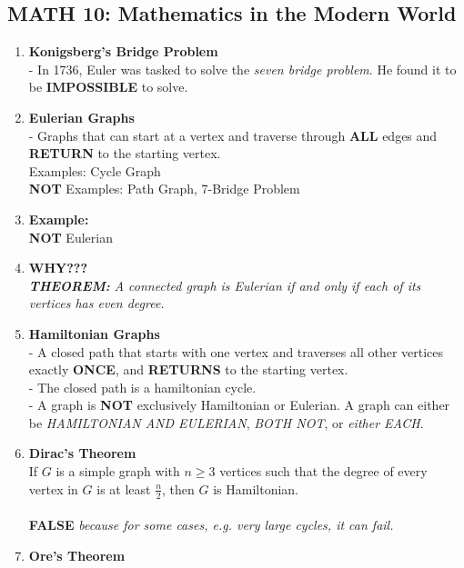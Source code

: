 \documentclass{article}
\begin{document}
\subsection*{MATH 10: Mathematics in the Modern World}
\begin{enumerate}
    \item \textbf{Konigsberg's Bridge Problem} \\
    - In 1736, Euler was tasked to solve the \textit{seven bridge problem}. He found it to be \textbf{IMPOSSIBLE} to solve. \\
    \item \textbf{Eulerian Graphs} \\
    - Graphs that can start at a vertex and traverse through \textbf{ALL} edges and \textbf{RETURN} to the starting vertex. \\
    Examples: Cycle Graph \\
    \textbf{NOT} Examples: Path Graph, 7-Bridge Problem
    \item \textbf{Example:} \\
    \textbf{NOT} Eulerian \\
    \item \textbf{WHY???} \\
    \textit{\textbf{THEOREM: }A connected graph is Eulerian if and only if each of its vertices has even degree.}
    \item \textbf{Hamiltonian Graphs} \\
    - A closed path that starts with one vertex and traverses all other vertices exactly \textbf{ONCE}, and \textbf{RETURNS} to the starting vertex. \\
    - The closed path is a hamiltonian cycle. \\
    - A graph is \textbf{NOT} exclusively Hamiltonian or Eulerian. A graph can either be \textit{HAMILTONIAN AND EULERIAN}, \textit{BOTH NOT}, or \textit{either EACH}. \\
    \item \textbf{Dirac's Theorem} \\
    If $G$ is a simple graph with $n\ge3$ vertices such that the degree of every vertex in $G$ is at least $\frac{n}{2}$, then $G$ is Hamiltonian. \\
    \\
    \textbf{FALSE} \textit{because for some cases, e.g. very large cycles, it can fail.}
    \item \textbf{Ore's Theorem} \\

\end{enumerate}
\end{document}
